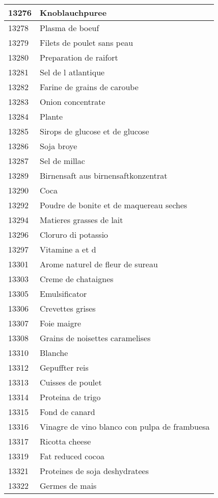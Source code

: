 \begin{longtable}{|l|l|}
13276 & Knoblauchpuree \\ \hline 
13278 & Plasma de boeuf \\ \hline 
13279 & Filets de poulet sans peau \\ \hline 
13280 & Preparation de raifort \\ \hline 
13281 & Sel de l atlantique \\ \hline 
13282 & Farine de grains de caroube \\ \hline 
13283 & Onion concentrate \\ \hline 
13284 & Plante \\ \hline 
13285 & Sirops de glucose et de glucose \\ \hline 
13286 & Soja broye \\ \hline 
13287 & Sel de millac \\ \hline 
13289 & Birnensaft aus birnensaftkonzentrat \\ \hline 
13290 & Coca \\ \hline 
13292 & Poudre de bonite et de maquereau seches \\ \hline 
13294 & Matieres grasses de lait \\ \hline 
13296 & Cloruro di potassio \\ \hline 
13297 & Vitamine a et d \\ \hline 
13301 & Arome naturel de fleur de sureau \\ \hline 
13303 & Creme de chataignes \\ \hline 
13305 & Emulsificator \\ \hline 
13306 & Crevettes grises \\ \hline 
13307 & Foie maigre \\ \hline 
13308 & Grains de noisettes caramelises \\ \hline 
13310 & Blanche \\ \hline 
13312 & Gepuffter reis \\ \hline 
13313 & Cuisses de poulet \\ \hline 
13314 & Proteina de trigo \\ \hline 
13315 & Fond de canard \\ \hline 
13316 & Vinagre de vino blanco con pulpa de frambuesa \\ \hline 
13317 & Ricotta cheese \\ \hline 
13319 & Fat reduced cocoa \\ \hline 
13321 & Proteines de soja deshydratees \\ \hline 
13322 & Germes de mais \\ \hline 

\end{longtable}
